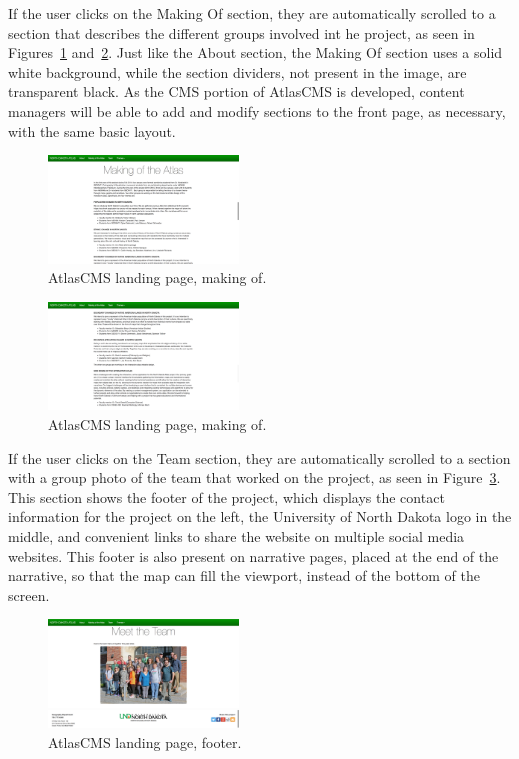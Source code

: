 \documentclass[11pt, final, conference, twocolumn]{IEEEtran}
\begin{document}
If the user clicks on the Making Of section, they are automatically scrolled to a section that describes the different groups involved int he project, as seen in Figures~\ref{fig:home_making_1} and~\ref{fig:home_making_2}. Just like the About section, the Making Of section uses a solid white background, while the section dividers, not present in the image, are transparent black. As the CMS portion of AtlasCMS is developed, content managers will be able to add and modify sections to the front page, as necessary, with the same basic layout.

\begin{figure}[h!]
	\centering
	\includegraphics[width=0.45\textwidth]{home_making_1}
	\caption{AtlasCMS landing page, making of.}
	\label{fig:home_making_1}
\end{figure}

\begin{figure}[h!]
	\centering
	\includegraphics[width=0.45\textwidth]{home_making_2}
	\caption{AtlasCMS landing page, making of.}
	\label{fig:home_making_2}
\end{figure}

If the user clicks on the Team section, they are automatically scrolled to a section with a group photo of the team that worked on the project, as seen in Figure~\ref{fig:home_bottom}. This section shows the footer of the project, which displays the contact information for the project on the left, the University of North Dakota logo in the middle, and convenient links to share the website on multiple social media websites. This footer is also present on narrative pages, placed at the end of the narrative, so that the map can fill the viewport, instead of the bottom of the screen.

\begin{figure}[h!]
	\centering
	\includegraphics[width=0.45\textwidth]{home_bottom}
	\caption{AtlasCMS landing page, footer.}
	\label{fig:home_bottom}
\end{figure}
\end{document}
